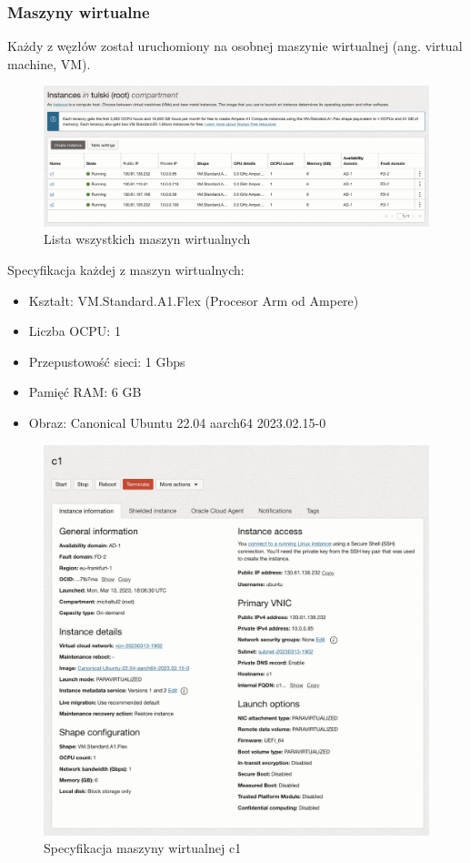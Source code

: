 \subsubsection{Maszyny wirtualne}

Każdy z węzłów został uruchomiony na osobnej maszynie wirtualnej (ang. virtual machine, VM).

\begin{figure}[H]
    \centering
    \includegraphics[width=\textwidth]{img/oci-compute-instances}
    \caption{Lista wszystkich maszyn wirtualnych}
    \label{fig:oci-compute-instances}
\end{figure}

Specyfikacja każdej z maszyn wirtualnych:
\begin{itemize}
    \item Kształt: VM.Standard.A1.Flex (Procesor Arm od Ampere)
    \item Liczba OCPU: 1
    \item Przepustowość sieci: 1 Gbps
    \item Pamięć RAM: 6 GB
    \item Obraz: Canonical Ubuntu 22.04 aarch64 2023.02.15-0
\end{itemize}

\begin{figure}[H]
    \centering
    \includegraphics[width=\textwidth]{img/oci-instance-details}
    \caption{Specyfikacja maszyny wirtualnej c1}
    \label{fig:oci-instance-details}
\end{figure}

